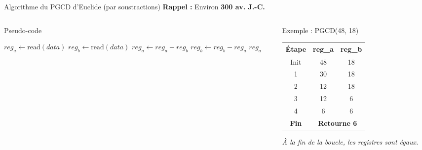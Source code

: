 \begin{frame}{Algorithme du PGCD d'Euclide (par soustractions)}
  \textbf{Rappel : } Environ \textbf{300 av. J.-C.}
    \begin{columns}[T]

        \begin{column}{0.55\textwidth}
            \begin{block}{Pseudo-code}
                \begin{algorithmic}[1]
                    \State $reg_a \gets \text{read}(data)$
                    \State $reg_b \gets \text{read}(data)$
                            \State $reg_a \gets reg_a - reg_b$
                        \Else
                            \State $reg_b \gets reg_b - reg_a$
                        \EndIf
                    \EndWhile
                    \State \Return $reg_a$
                \end{algorithmic}
            \end{block}

        \end{column}

        \begin{column}{0.40\textwidth}
            \begin{block}{Exemple : PGCD(48, 18)}
                \small
                \begin{center}
                    \begin{tabular}{c|c|c}
                        \textbf{Étape} & \textbf{reg\_a} & \textbf{reg\_b} \\
                        \hline
                        Init & 48 & 18 \\
                        1 & 30 & 18 \\
                        2 & 12 & 18 \\
                        3 & 12 & 6 \\
                        4 & 6 & 6 \\
                        \hline
                        \textbf{Fin} & \multicolumn{2}{c}{\textbf{Retourne 6}}
                    \end{tabular}
                \end{center}
                \vspace{0.2cm}
                \footnotesize \textit{À la fin de la boucle, les registres sont égaux.}
            \end{block}
        \end{column}

    \end{columns}


\end{frame}

